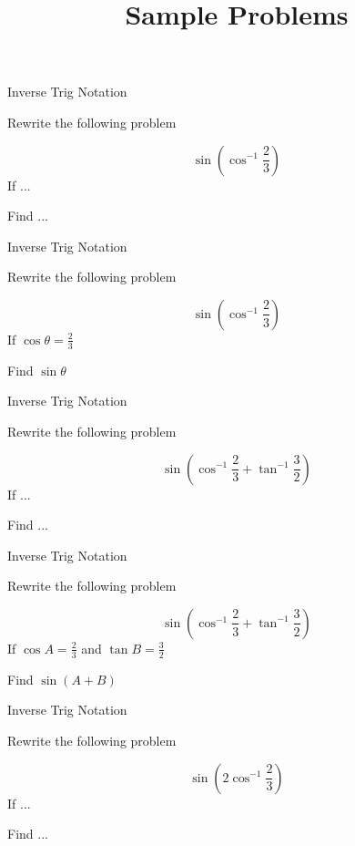 \documentclass[11pt,xcolor=dvipsnames]{beamer}
\date[mm]
\title[Sample Problems] {Sample Problems}
\begin{document}
\begin{frame}
	\titlepage
\end{frame}
	
\begin{frame}{Inverse Trig Notation}

Rewrite the following problem

\[ \sin \left (\cos^{-1}  \frac{2}{3} \right)\]
\vfill 
If ...

\bigskip

Find ...
\vfill 

\end{frame}

\begin{frame}{Inverse Trig Notation}

Rewrite the following problem

\[ \sin \left (\cos^{-1}  \frac{2}{3} \right)\]
\vfill 
If $\cos \theta = \frac{2}{3}$

\bigskip

Find $\sin \theta$
\vfill 

\end{frame}	
		\begin{frame}{Inverse Trig Notation}

Rewrite the following problem

\[ \sin \left (\cos^{-1}  \frac{2}{3} + \tan^{-1} \frac{3}{2} \right)\]
\vfill 
If ...

\bigskip

Find ...
\vfill 

\end{frame}

\begin{frame}{Inverse Trig Notation}

Rewrite the following problem

\[ \sin \left (\cos^{-1}  \frac{2}{3} + \tan^{-1} \frac{3}{2} \right)\]
\vfill 
If $\cos A = \frac{2}{3}$ and $\tan B = \frac{3}{2}$

\bigskip

Find $\sin(A+B)$

\vfill 

\end{frame}	
	\begin{frame}{Inverse Trig Notation}

Rewrite the following problem

\[ \sin \left (2 \cos^{-1}  \frac{2}{3} \right)\]
\vfill 
If ...

\bigskip

Find ...
\vfill 

\end{frame}
\end{document}
